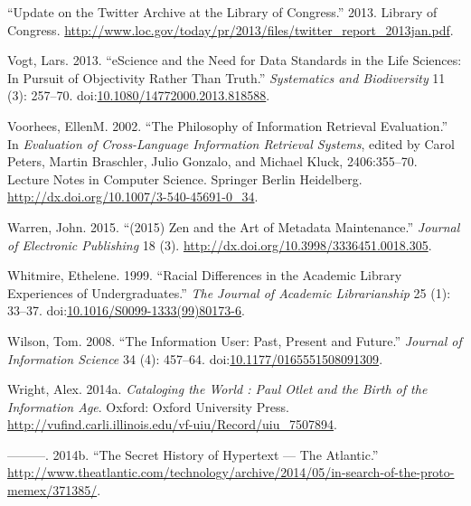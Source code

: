 \documentclass[]{article}
\begin{document}
\hypertarget{ref-ux5fupdateux5f2013}{}
``Update on the Twitter Archive at the Library of Congress.'' 2013.
Library of Congress.
\url{http://www.loc.gov/today/pr/2013/files/twitter_report_2013jan.pdf}.

\hypertarget{ref-vogtux5fescienceux5f2013}{}
Vogt, Lars. 2013. ``eScience and the Need for Data Standards in the Life
Sciences: In Pursuit of Objectivity Rather Than Truth.''
\emph{Systematics and Biodiversity} 11 (3): 257--70.
doi:\href{https://doi.org/10.1080/14772000.2013.818588}{10.1080/14772000.2013.818588}.

\hypertarget{ref-petersux5fphilosophyux5f2002}{}
Voorhees, EllenM. 2002. ``The Philosophy of Information Retrieval
Evaluation.'' In \emph{Evaluation of Cross-Language Information
Retrieval Systems}, edited by Carol Peters, Martin Braschler, Julio
Gonzalo, and Michael Kluck, 2406:355--70. Lecture Notes in Computer
Science. Springer Berlin Heidelberg.
\url{http://dx.doi.org/10.1007/3-540-45691-0_34}.

\hypertarget{ref-warrenux5f2015ux5f2015}{}
Warren, John. 2015. ``(2015) Zen and the Art of Metadata Maintenance.''
\emph{Journal of Electronic Publishing} 18 (3).
\url{http://dx.doi.org/10.3998/3336451.0018.305}.

\hypertarget{ref-whitmireux5fracialux5f1999}{}
Whitmire, Ethelene. 1999. ``Racial Differences in the Academic Library
Experiences of Undergraduates.'' \emph{The Journal of Academic
Librarianship} 25 (1): 33--37.
doi:\href{https://doi.org/10.1016/S0099-1333(99)80173-6}{10.1016/S0099-1333(99)80173-6}.

\hypertarget{ref-wilsonux5finformationux5f2008}{}
Wilson, Tom. 2008. ``The Information User: Past, Present and Future.''
\emph{Journal of Information Science} 34 (4): 457--64.
doi:\href{https://doi.org/10.1177/0165551508091309}{10.1177/0165551508091309}.

\hypertarget{ref-wrightux5fcatalogingux5f2014}{}
Wright, Alex. 2014a. \emph{Cataloging the World : Paul Otlet and the
Birth of the Information Age}. Oxford: Oxford University Press.
\url{http://vufind.carli.illinois.edu/vf-uiu/Record/uiu_7507894}.

\hypertarget{ref-wrightux5fsecretux5f2014}{}
---------. 2014b. ``The Secret History of Hypertext --- The Atlantic.''
\url{http://www.theatlantic.com/technology/archive/2014/05/in-search-of-the-proto-memex/371385/}.
\end{document}
